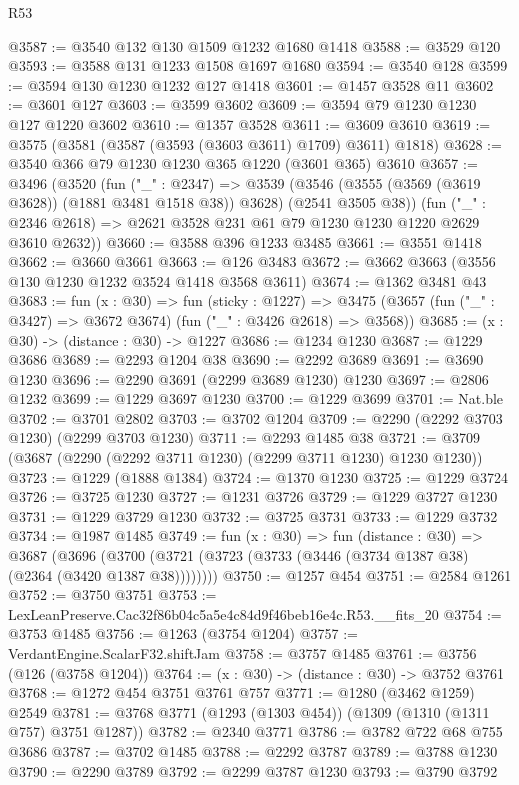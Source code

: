 \begin{lexlean}{R53}
\begin{coremodule}
@3587 := @3540 @132 @130 @1509 @1232 @1680 @1418
@3588 := @3529 @120
@3593 := @3588 @131 @1233 @1508 @1697 @1680
@3594 := @3540 @128
@3599 := @3594 @130 @1230 @1232 @127 @1418
@3601 := @1457 @3528 @11
@3602 := @3601 @127
@3603 := @3599 @3602
@3609 := @3594 @79 @1230 @1230 @127 @1220 @3602
@3610 := @1357 @3528
@3611 := @3609 @3610
@3619 := @3575 (@3581 (@3587 (@3593 (@3603 @3611) @1709) @3611) @1818)
@3628 := @3540 @366 @79 @1230 @1230 @365 @1220 (@3601 @365) @3610
@3657 := @3496
    (@3520
      (fun ("_" : @2347) =>
      @3539 (@3546 (@3555 (@3569 (@3619 @3628)) (@1881 @3481 @1518 @38)) @3628) (@2541 @3505 @38))
      (fun ("_" : @2346 @2618) => @2621 @3528 @231 @61 @79 @1230 @1230 @1220 @2629 @3610 @2632))
@3660 := @3588 @396 @1233 @3485
@3661 := @3551 @1418
@3662 := @3660 @3661
@3663 := @126 @3483
@3672 := @3662 @3663 (@3556 @130 @1230 @1232 @3524 @1418 @3568 @3611)
@3674 := @1362 @3481 @43
@3683 := fun (x : @30) =>
  fun (sticky : @1227) =>
  @3475 (@3657 (fun ("_" : @3427) => @3672 @3674) (fun ("_" : @3426 @2618) => @3568))
@3685 := (x : @30) -> (distance : @30) -> @1227
@3686 := @1234 @1230
@3687 := @1229 @3686
@3689 := @2293 @1204 @38
@3690 := @2292 @3689
@3691 := @3690 @1230
@3696 := @2290 @3691 (@2299 @3689 @1230) @1230
@3697 := @2806 @1232
@3699 := @1229 @3697 @1230
@3700 := @1229 @3699
@3701 := Nat.ble
@3702 := @3701 @2802
@3703 := @3702 @1204
@3709 := @2290 (@2292 @3703 @1230) (@2299 @3703 @1230)
@3711 := @2293 @1485 @38
@3721 := @3709 (@3687 (@2290 (@2292 @3711 @1230) (@2299 @3711 @1230) @1230 @1230))
@3723 := @1229 (@1888 @1384)
@3724 := @1370 @1230
@3725 := @1229 @3724
@3726 := @3725 @1230
@3727 := @1231 @3726
@3729 := @1229 @3727 @1230
@3731 := @1229 @3729 @1230
@3732 := @3725 @3731
@3733 := @1229 @3732
@3734 := @1987 @1485
@3749 := fun (x : @30) =>
  fun (distance : @30) =>
  @3687 (@3696 (@3700 (@3721 (@3723 (@3733 (@3446 (@3734 @1387 @38) (@2364 (@3420 @1387 @38))))))))
@3750 := @1257 @454
@3751 := @2584 @1261
@3752 := @3750 @3751
@3753 := LexLeanPreserve.Cac32f86b04c5a5e4c84d9f46beb16e4c.R53.__fits_20
@3754 := @3753 @1485
@3756 := @1263 (@3754 @1204)
@3757 := VerdantEngine.ScalarF32.shiftJam
@3758 := @3757 @1485
@3761 := @3756 (@126 (@3758 @1204))
@3764 := (x : @30) -> (distance : @30) -> @3752 @3761
@3768 := @1272 @454 @3751 @3761 @757
@3771 := @1280 (@3462 @1259) @2549
@3781 := @3768 @3771 (@1293 (@1303 @454)) (@1309 (@1310 (@1311 @757) @3751 @1287))
@3782 := @2340 @3771
@3786 := @3782 @722 @68 @755 @3686
@3787 := @3702 @1485
@3788 := @2292 @3787
@3789 := @3788 @1230
@3790 := @2290 @3789
@3792 := @2299 @3787 @1230
@3793 := @3790 @3792

\end{coremodule}
\end{lexlean}
